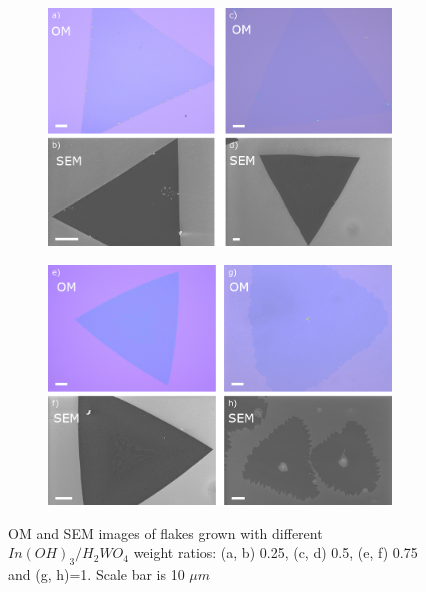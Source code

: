 \begin{figure}[!ht]
	\begin{center}
		\begin{subfigure}[b]{0.7\textwidth}
			\includegraphics[width=\textwidth]{In/OMSEMImages1.png}
			\label{fig:InOMSEMImages1}
		\end{subfigure}
		\qquad
		\begin{subfigure}[b]{0.7\textwidth}
			\includegraphics[width=\textwidth]{In/OMSEMImages2.png}
			\label{fig:InOMSEMImages2}
		\end{subfigure}
		\caption{OM and SEM images of flakes grown with different $In(OH)_3/H_2WO_4$ weight ratios: (a, b) 0.25, (c, d) 0.5, (e, f) 0.75 and (g, h)=1. Scale bar is 10 $\mu m$}
		\label{fig:InOMSEMImages}
	\end{center}
\end{figure}

